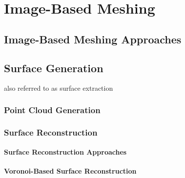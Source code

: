 \chapter{Image-Based Meshing}
%
\section{Image-Based Meshing Approaches}
\label{Image-Based Meshing Approaches}

\section{Surface Generation}
\label{Surface Generation}
also referred to as surface extraction

\subsection{Point Cloud Generation}
\label{Point Cloud Generation}

\subsection{Surface Reconstruction}
\label{Surface Reconstruction}

\subsubsection{Surface Reconstruction Approaches}
\label{Surface Reconstruction Approaches}

\subsubsection{Voronoi-Based Surface Reconstruction}
\label{Voronoi-Based Surface Reconstruction}

